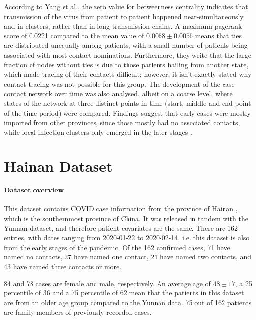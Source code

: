 According to Yang et al., the zero value for betweenness centrality indicates that transmission of the virus from patient to patient happened near-simultaneously and in clusters, rather than in long transmission chains. A maximum pagerank score of 0.0221 compared to the mean value of $0.0058\pm0.0055$ means that ties are distributed unequally among patients, with a small number of patients being associated with most contact nominations. Furthermore, they write that the large fraction of nodes without ties is due to those patients hailing from another state, which made tracing of their contacts difficult; however, it isn't exactly stated why contact tracing was not possible for this group. The development of the case contact network over time was also analysed, albeit on a coarse level, where states of the network at three distinct points in time (start, middle and end point of the time period) were compared. Findings suggest that early cases were mostly imported from other provinces, since those mostly had no associated contacts, while local infection clusters only emerged in the later stages \cite{hainan_publication}. 

\section{Hainan Dataset}
\label{sec:hainan_data}

\paragraph{Dataset overview} This dataset contains COVID case information from the province of Hainan \cite{hainan_data}, which is the southernmost province of China. It was released in tandem with the Yunnan dataset, and therefore patient covariates are the same. There are 162 entries, with dates ranging from 2020-01-22 to 2020-02-14, i.e. this dataset is also from the early stages of the pandemic. Of the 162 confirmed cases, 71 have named no contacts, 27 have named one contact, 21 have named two contacts, and 43 have named three contacts or more. 

84 and 78 cases are female and male, respectively. An average age of $48\pm17$, a 25 percentile of 36 and a 75 percentile of 62 mean that the patients in this dataset are from an older age group compared to the Yunnan data. 75 out of 162 patients are family members of previously recorded cases.

